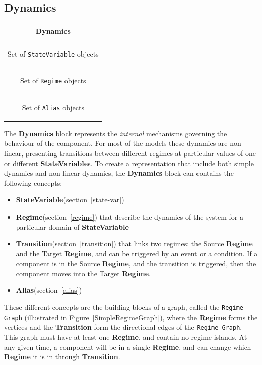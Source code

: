 \documentclass{article}
\newcommand{\Dynamics}{{\bf{Dynamics}}\xspace}
\newcommand{\StateVariable}{{\bf{StateVariable}}\xspace}
\newcommand{\StateVariables}{{\bf{StateVariable}}s\xspace}
\newcommand{\Alias}{{\bf{Alias}}\xspace}
\newcommand{\Regime}{{\bf{Regime}}\xspace}
\newcommand{\Transition}{{\bf{Transition}}\xspace}
\begin{document}
\subsection{Dynamics}


\begin{table}[htb]
\center
\begin{tabular}{|c|}
\hline
\hline
Dynamics \\
\hline \\
\colorbox{issuecolor}{\parbox{0.4\linewidth}
{\center Set of {\tt StateVariable} objects}} \\
\hline
\colorbox{issuecolor}{\parbox{0.4\linewidth}
{\center Set of {\tt Regime} objects}} \\
\hline
\colorbox{issuecolor}{\parbox{0.4\linewidth}
{\center Set of {\tt Alias} objects}} \\
\hline
\end{tabular}
\end{table}


The \Dynamics block represents the \emph{internal} mechanisms
governing the behaviour of the component.  For most of the models
these dynamics are non-linear, presenting transitions between
different regimes at particular values of one or different \StateVariables.
To create a representation that include both simple
dynamics and non-linear dynamics, the \Dynamics block can contains the
following concepts:

\begin{itemize}
\item \StateVariable (section~\ref{state-var})
\item \Regime (section~\ref{regime}) that describe the dynamics of the
system for a particular domain of \StateVariable
\item \Transition (section~\ref{transition}) that links two
regimes: the Source \Regime and the Target \Regime, and can be triggered by
an event or a condition. If a component is in the Source \Regime, and the
transition is triggered, then the component moves into the Target \Regime.
\item \Alias (section~\ref{alias})
\end{itemize}


These different concepts are the building blocks of a graph, called
the {\tt Regime Graph} (illustrated in Figure~\ref{SimpleRegimeGraph}),
where the \Regime forms the vertices and the \Transition form the
directional edges of the {\tt Regime Graph}. This graph must have at
least one \Regime, and contain no regime islands. At any given time,
a component will be in a single \Regime, and can change which \Regime
it is in through \Transition.
\end{document}
